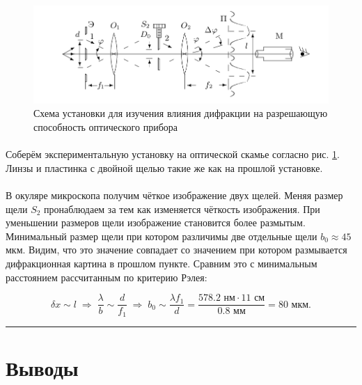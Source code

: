 \documentclass[a4paper,12pt]{article} %
\begin{document}
\begin{figure}[h]
\centering
\includegraphics[width=\textwidth]{setup4.png}
\caption{\centering Схема установки для изучения влияния дифракции на разрешающую способность  оптического прибора}
\label{fig:setup4}
\end{figure}

\paragraph{} Соберём экспериментальную установку на оптической скамье согласно рис. \ref{fig:setup4}. Линзы и пластинка с двойной щелью такие же как на прошлой установке.

\paragraph{} В окуляре микроскопа получим чёткое изображение двух щелей. Меняя размер щели $S_2$ пронаблюдаем за тем как изменяется чёткость изображения. При уменьшении размеров щели изображение становится более размытым. Минимальный размер щели при котором различимы две отдельные щели $b_0 \approx 45$ мкм. Видим, что это значение совпадает со значением при котором размывается дифракционная картина в прошлом пункте. Сравним это с минимальным расстоянием рассчитанным по критерию Рэлея:

\[
\delta x \sim l \; \Rightarrow \; \frac{\lambda}{b} \sim \frac{d}{f_1} \; \Rightarrow \; b_0 \sim \frac{\lambda f_1}{d} = \frac{578.2 \text{ нм} \cdot 11 \text{ см}}{0.8 \text{ мм}} = 80 \text{ мкм}. 
\]

\medskip\hrule\medskip

\section{Выводы}
\end{document}
